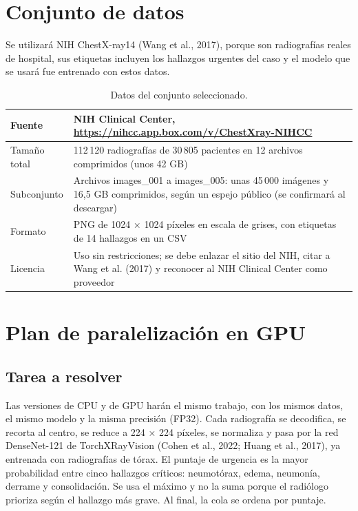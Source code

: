 \documentclass[11pt,letterpaper]{article}
\begin{document}
\section{Conjunto de datos}

Se utilizará NIH ChestX-ray14 (Wang et al., 2017), porque son radiografías reales de hospital, sus etiquetas incluyen los hallazgos urgentes del caso y el modelo que se usará fue entrenado con estos datos.

\begin{table}[h]
\centering
\caption{Datos del conjunto seleccionado.}
\begin{tabularx}{\linewidth}{|l|X|}
\hline
Fuente & NIH Clinical Center, \url{https://nihcc.app.box.com/v/ChestXray-NIHCC} \\ \hline
Tamaño total & 112\,120 radiografías de 30\,805 pacientes en 12 archivos comprimidos (unos 42 GB) \\ \hline
Subconjunto & Archivos images\_001 a images\_005: unas 45\,000 imágenes y 16,5 GB comprimidos, según un espejo público (se confirmará al descargar) \\ \hline
Formato & PNG de 1024 × 1024 píxeles en escala de grises, con etiquetas de 14 hallazgos en un CSV \\ \hline
Licencia & Uso sin restricciones; se debe enlazar el sitio del NIH, citar a Wang et al. (2017) y reconocer al NIH Clinical Center como proveedor \\ \hline
\end{tabularx}
\end{table}

\section{Plan de paralelización en GPU}

\subsection{Tarea a resolver}

Las versiones de CPU y de GPU harán el mismo trabajo, con los mismos datos, el mismo modelo y la misma precisión (FP32). Cada radiografía se decodifica, se recorta al centro, se reduce a 224 × 224 píxeles, se normaliza y pasa por la red DenseNet-121 de TorchXRayVision (Cohen et al., 2022; Huang et al., 2017), ya entrenada con radiografías de tórax. El puntaje de urgencia es la mayor probabilidad entre cinco hallazgos críticos: neumotórax, edema, neumonía, derrame y consolidación. Se usa el máximo y no la suma porque el radiólogo prioriza según el hallazgo más grave. Al final, la cola se ordena por puntaje.
\end{document}
